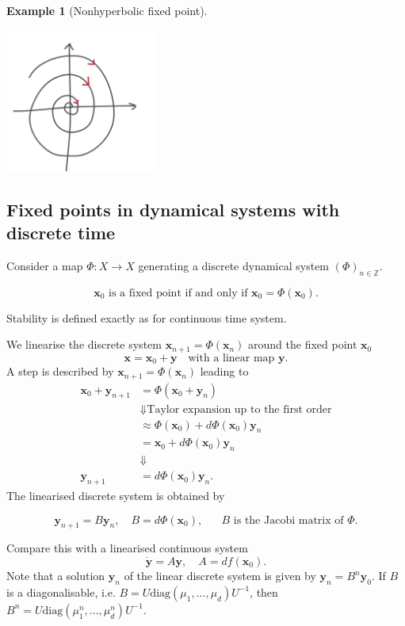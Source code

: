 \documentclass[hidelinks,a4paper, 11pt]{article}
\theoremstyle{plain}
\theoremstyle{break}
\theoremstyle{plain}
\theoremstyle{definition}
\newtheorem*{example}{Example}
\begin{document}
\begin{example}[Nonhyperbolic fixed point]
	\begin{center}
		\includegraphics[width=5cm]{nonhyperbolic_stable_example}
	\end{center}
\end{example}

\subsection{Fixed points in dynamical systems with discrete time} \label{chap:fixed-points-dynamical-systems}
Consider a map $\Phi: X \to X$ generating a discrete dynamical system $(\Phi)_{n \in \mathbb Z}$.
\begin{framed}
	\[
		\text{$\mathbf x_0$ is a fixed point if and only if $\mathbf x_0 = \Phi(\mathbf x_0)$}.
	\]
\end{framed}
Stability is defined exactly as for continuous time system.

We linearise the discrete system $\mathbf x_{n+1}  = \Phi(\mathbf x_n)$ around the fixed point $\mathbf x_0$
\[
	\mathbf x = \mathbf x_0 + \mathbf y \quad \text{with a linear map $\mathbf y$}.
\]
A step is described by $\mathbf x_{n+1} = \Phi(\mathbf x_n)$ leading to 
\begin{align*}
	\mathbf x_0 + \mathbf y_{n+1} &= \Phi(\mathbf x_0 + \mathbf y_n)\\
	&\Downarrow \text{Taylor expansion up to the first order} \\
	&\approx \Phi(\mathbf x_0) + d \Phi(\mathbf x_0)\mathbf y_n \\
	&= \mathbf x_0 + d \Phi(\mathbf x_0)\mathbf y_n \\
	&\Downarrow \\
	\mathbf{y}_{n+1} &= d \Phi(\mathbf x_0)\mathbf y_n.
\end{align*}
The linearised discrete system is obtained by
\begin{framed}
\[
	\mathbf y_{n+1} = B\mathbf y_n, \quad B = d \Phi(\mathbf x_0), \quad  \text{ $B$ is the Jacobi matrix of $\Phi$}.
\]
\end{framed}
Compare this with a linearised continuous system
\[
	\mathbf{\dot y} = A \mathbf y, \quad A = df(\mathbf x_0).
\]
Note that a solution $\mathbf y_n$ of the linear discrete system is given by $\mathbf y_n = B^n \mathbf y_0$. If $B$ is a diagonalisable, i.e. $B = U\mathrm{diag}(\mu_1,...,\mu_d)U^{-1}$, then $B^n = U \mathrm{diag}(\mu_1^n,...,\mu_d^n) U^{-1}$.
\end{document}
